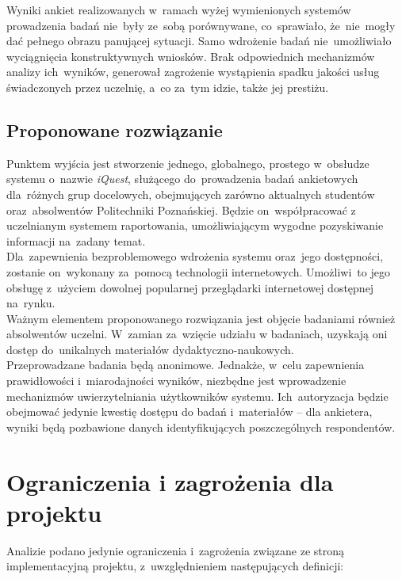 Wyniki ankiet realizowanych w~ramach wyżej wymienionych systemów prowadzenia badań nie~były ze~sobą porównywane, co~sprawiało, że~nie~mogły dać pełnego obrazu panującej sytuacji. Samo wdrożenie badań nie~umożliwiało wyciągnięcia konstruktywnych wniosków. Brak odpowiednich mechanizmów analizy ich~wyników, generował zagrożenie wystąpienia spadku jakości usług świadczonych przez uczelnię, a~co za~tym idzie, także jej prestiżu.

\subsection{Proponowane rozwiązanie}
\label{Chapter112}

Punktem wyjścia jest stworzenie jednego, globalnego, prostego w~obsłudze systemu o~nazwie \textit{iQuest}, służącego do~prowadzenia badań ankietowych dla~różnych grup docelowych, obejmujących zarówno aktualnych studentów oraz~absolwentów Politechniki Poznańskiej. Będzie on~współpracować z uczelnianym systemem raportowania, umożliwiającym wygodne pozyskiwanie informacji na~zadany temat. \\

Dla~zapewnienia bezproblemowego wdrożenia systemu oraz~jego dostępności, zostanie on~wykonany za~pomocą technologii internetowych. Umożliwi~to jego obsługę z~użyciem dowolnej popularnej przeglądarki internetowej dostępnej na~rynku. \\

Ważnym elementem proponowanego rozwiązania jest objęcie badaniami również absolwentów uczelni. W~zamian za~wzięcie udziału w badaniach, uzyskają oni dostęp do~unikalnych materiałów dydaktyczno-naukowych. \\

Przeprowadzane badania będą anonimowe. Jednakże, w~celu zapewnienia prawidłowości i~miarodajności wyników, niezbędne jest wprowadzenie mechanizmów uwierzytelniania użytkowników systemu. Ich~autoryzacja będzie obejmować jedynie kwestię dostępu do badań i~materiałów -- dla ankietera, wyniki będą pozbawione danych identyfikujących poszczególnych respondentów.

\section{Ograniczenia i zagrożenia dla projektu}
\label{Chapter12}

Analizie podano jedynie ograniczenia i~zagrożenia związane ze stroną implementacyjną projektu, z~uwzględnieniem następujących definicji:

